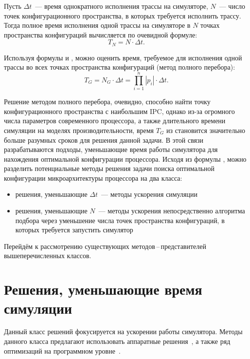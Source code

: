 Пусть $\Delta t$~--- время однократного исполнения трассы на симуляторе, $N$~--- число точек конфигурационного пространства, в которых требуется исполнить трассу. Тогда полное время исполнения одной трассы на симуляторе в $N$ точках пространства конфигураций вычисляется по очевидной формуле:
\begin{equation}\label{eq:TN}
  T_N = N \cdot \Delta t.
\end{equation}

Используя формулы  и , можно оценить время, требуемое для исполнения одной трассы во всех точках пространства конфигураций (метод полного перебора):
\begin{equation}\label{eq:bf_time}
  T_{G} = N_G \cdot \Delta t = \prod_{i = 1}^{n} \left|p_i\right| \cdot \Delta t.
\end{equation}

Решение методом полного перебора, очевидно, способно найти точку конфигурационного пространства с наибольшим IPC, однако из-за огромного числа параметров современного процессора, а также длительного времени симуляции на моделях производительности, время $T_G$ из  становится значительно больше разумных сроков для решения данной задачи. В этой связи разрабатываются подходы, уменьшающие время работы симулятора для нахождения оптимальной конфигурации процессора. Исходя из формулы , можно разделить потенциальные методы решения задачи поиска оптимальной конфигурации микроархитектуры процессора на два класса:
\begin{itemize}
  \item решения, уменьшающие $\Delta t$~--- методы ускорения симуляции
  \item решения, уменьшающие $N$~--- методы ускорения непосредственно алгоритма подбора через уменьшение числа точек пространства конфигураций, в которых требуется запустить симулятор
\end{itemize}

Перейдём к рассмотрению существующих методов\,--\,представителей вышеперечисленных классов.

\section{Решения, уменьшающие время симуляции}

Данный класс решений фокусируется на ускорении работы симулятора. Методы данного класса предлагают использовать аппаратные решения~\cite{chiou2007fpga}, а также ряд оптимизаций на программном уровне~\cite{miller2010graphite,carlson2011sniper}.

